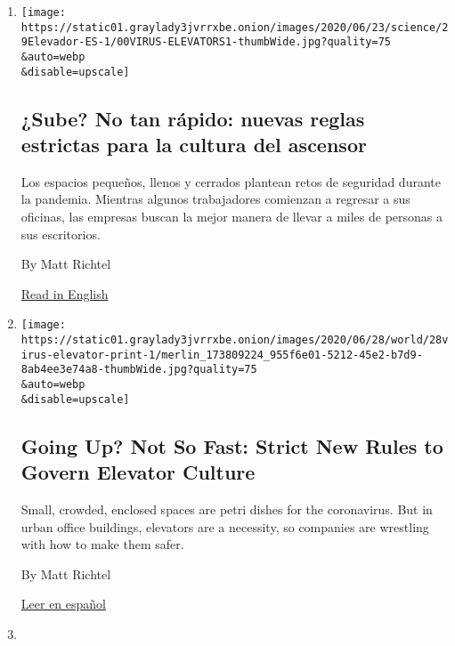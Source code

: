 \begin{enumerate}
\def\labelenumi{\arabic{enumi}.}
\item
  \href{/es/2020/06/29/espanol/ciencia-y-tecnologia/coronavirus-ascensor-contagio.html}{}

  \texttt{[image: https://static01.graylady3jvrrxbe.onion/images/2020/06/23/science/29Elevador-ES-1/00VIRUS-ELEVATORS1-thumbWide.jpg?quality=75\\\&auto=webp\\\&disable=upscale]}

  \hypertarget{sube-no-tan-ruxe1pido-nuevas-reglas-estrictas-para-la-cultura-del-ascensor}{%
  \subsection{¿Sube? No tan rápido: nuevas reglas estrictas para la
  cultura del
  ascensor}\label{sube-no-tan-ruxe1pido-nuevas-reglas-estrictas-para-la-cultura-del-ascensor}}

  Los espacios pequeños, llenos y cerrados plantean retos de seguridad
  durante la pandemia. Mientras algunos trabajadores comienzan a
  regresar a sus oficinas, las empresas buscan la mejor manera de llevar
  a miles de personas a sus escritorios.

  By Matt Richtel

  \href{https://www.nytimes3xbfgragh.onion/2020/06/26/health/coronavirus-elevator-reopen.html}{Read
  in English}
\item
  \href{/2020/06/26/health/coronavirus-elevator-reopen.html}{}

  \texttt{[image: https://static01.graylady3jvrrxbe.onion/images/2020/06/28/world/28virus-elevator-print-1/merlin\_173809224\_955f6e01-5212-45e2-b7d9-8ab4ee3e74a8-thumbWide.jpg?quality=75\\\&auto=webp\\\&disable=upscale]}

  \hypertarget{going-up-not-so-fast-strict-new-rules-to-govern-elevator-culture}{%
  \subsection{Going Up? Not So Fast: Strict New Rules to Govern Elevator
  Culture}\label{going-up-not-so-fast-strict-new-rules-to-govern-elevator-culture}}

  Small, crowded, enclosed spaces are petri dishes for the coronavirus.
  But in urban office buildings, elevators are a necessity, so companies
  are wrestling with how to make them safer.

  By Matt Richtel

  \href{https://www.nytimes3xbfgragh.onion/es/2020/06/29/espanol/ciencia-y-tecnologia/coronavirus-ascensor-contagio.html}{Leer
  en español}
\item
  \href{/2020/06/04/health/coronavirus-hunger-unemployment.html}{}


\end{enumerate}
